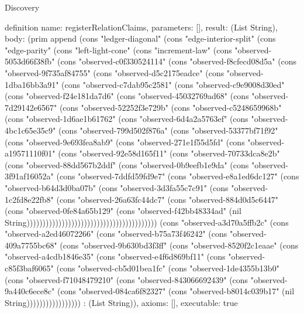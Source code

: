\begin{lexlean}{Discovery}
\begin{semanticmodule}
definition{
  name: registerRelationClaims,
  parameters: [],
  result: (List String),
  body: (prim append (cons "ledger-diagonal" (cons "edge-interior-split" (cons "edge-parity" (cons "left-light-cone" (cons "increment-law" (cons "observed-5053d66f38fb" (cons "observed-c0f330524114" (cons "observed-f8cfecd08d5a" (cons "observed-9f735af84755" (cons "observed-d5c2175eadce" (cons "observed-1dba16bb3a91" (cons "observed-c7dab95c2581" (cons "observed-c9e9008d30ed" (cons "observed-f24e181da7d6" (cons "observed-45032769ad68" (cons "observed-7d29142e6567" (cons "observed-52252f3e729b" (cons "observed-c5248659968b" (cons "observed-1d6ae1b61762" (cons "observed-6d4a2a5763ef" (cons "observed-4bc1c65e35c9" (cons "observed-799d502f876a" (cons "observed-53377bf71f92" (cons "observed-9e693fea8ab9" (cons "observed-271e1f55d5fd" (cons "observed-a19571110f01" (cons "observed-92e58d165f11" (cons "observed-70733dca8e2b" (cons "observed-88dd567b2ddf" (cons "observed-0b9eefb1e9da" (cons "observed-3f91af16052a" (cons "observed-7ddfd59fd9e7" (cons "observed-e8a1ed6dc127" (cons "observed-b64d3d0ba07b" (cons "observed-3d3fa55c7c91" (cons "observed-1c2fd8e22fb8" (cons "observed-26a63fc44dc7" (cons "observed-884d0d5c6447" (cons "observed-0fe84a65b129" (cons "observed-f42bb48334ad" (nil String))))))))))))))))))))))))))))))))))))))))) (cons "observed-a3d70a5ffb2c" (cons "observed-a2ed46072266" (cons "observed-b75a73f46242" (cons "observed-409a7755bc68" (cons "observed-9b630bd3f3ff" (cons "observed-8520f2c1eaae" (cons "observed-a4cdb1846e35" (cons "observed-e4f6d869bf11" (cons "observed-c85f3baf6065" (cons "observed-cb5d01bea1fc" (cons "observed-1de4355b13b0" (cons "observed-f71048479210" (cons "observed-843066692439" (cons "observed-9a440c6ece8c" (cons "observed-084ca6f82327" (cons "observed-b8014c039b17" (nil String))))))))))))))))) : (List String)),
  axioms: [],
  executable: true
}


\end{semanticmodule}
\end{lexlean}
